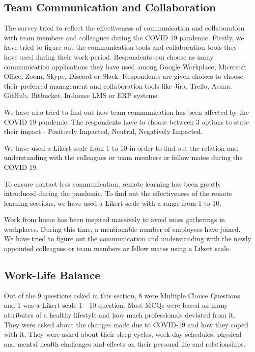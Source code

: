 \documentclass[11pt]{article}
\begin{document}
\subsection {Team Communication and Collaboration}
The survey tried to reflect the effectiveness of communication and collaboration with team members and colleagues during the COVID 19 pandemic.
Firstly, we have tried to figure out the communication tools and collaboration tools they have used during their work period. Respondents can choose as many communication applications they have used among Google Workplace, Microsoft Office, Zoom, Skype, Discord or Slack. Respondents are given choices to choose their preferred management and collaboration tools like Jira, Trello, Asana, GitHub, Bitbucket, In-house LMS or ERP systems.

We have also tried to find out how team communication has been affected by the COVID 19 pandemic. The respondents have to choose between 3 options to state their impact - Positively Impacted, Neutral, Negatively Impacted.

We have used a Likert scale from 1 to 10 in order to find out the relation and understanding with the colleagues or team members or fellow mates during the COVID 19.

To ensure contact less communication, remote learning has been greatly introduced during the pandemic. To find out the effectiveness of the remote learning sessions, we have used a Likert scale with a range from 1 to 10.

Work from home has been inspired massively to avoid mass gatherings in workplaces. During this time, a mentionable number of employees have joined. We have tried to figure out the communication and understanding with the newly appointed colleagues or team members or fellow mates using a Likert scale.


\subsection {Work-Life Balance}
Out of the 9 questions asked in this section, 8 were Multiple Choice Questions and 1 was a Likert scale 1 - 10 question. Most MCQs were based on many attributes of a healthy lifestyle and how much professionals deviated from it.  They were asked about the changes made due to COVID-19 and how they coped with it. They were asked about their sleep cycles, week-day schedules, physical and mental health challenges and effects on their personal life and relationships. 
\end{document}
